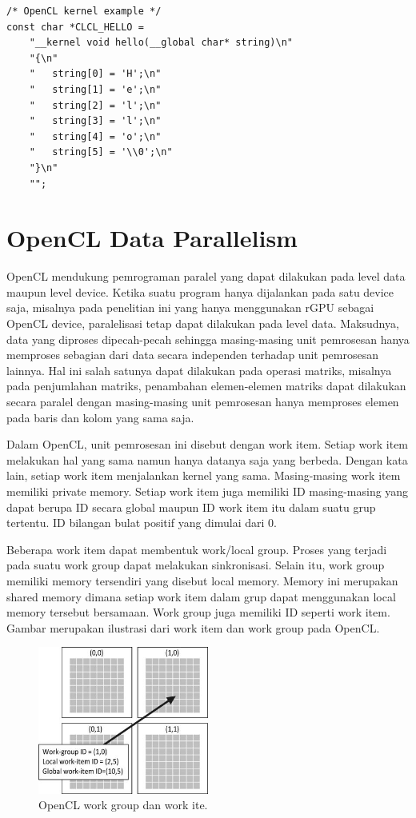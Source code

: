 \begin{lstlisting}[frame=single]
/* OpenCL kernel example */
const char *CLCL_HELLO =
    "__kernel void hello(__global char* string)\n"
    "{\n"
    "   string[0] = 'H';\n"
    "   string[1] = 'e';\n"
    "   string[2] = 'l';\n"
    "   string[3] = 'l';\n"
    "   string[4] = 'o';\n"
    "   string[5] = '\\0';\n"
    "}\n"
    "";
\end{lstlisting}

\section{OpenCL Data Parallelism}
OpenCL mendukung pemrograman paralel yang dapat dilakukan pada level data maupun level device. Ketika suatu program hanya dijalankan pada satu device saja, misalnya pada penelitian ini yang hanya menggunakan rGPU sebagai OpenCL device, paralelisasi tetap dapat dilakukan pada level data. Maksudnya, data yang diproses dipecah-pecah sehingga masing-masing unit pemrosesan hanya memproses sebagian dari data secara independen terhadap unit pemrosesan lainnya. Hal ini salah satunya dapat dilakukan pada operasi matriks, misalnya pada penjumlahan matriks, penambahan elemen-elemen matriks dapat dilakukan secara paralel dengan masing-masing unit pemrosesan hanya memproses elemen pada baris dan kolom yang sama saja.

Dalam OpenCL, unit pemrosesan ini disebut dengan work item. Setiap work item melakukan hal yang sama namun hanya datanya saja yang berbeda. Dengan kata lain, setiap work item menjalankan kernel yang sama. Masing-masing work item memiliki private memory. Setiap work item juga memiliki ID masing-masing yang dapat berupa ID secara global maupun ID work item itu dalam suatu grup tertentu. ID bilangan bulat positif yang dimulai dari 0.  

Beberapa work item dapat membentuk work/local group. Proses yang terjadi pada suatu work group dapat melakukan sinkronisasi. Selain itu, work group memiliki memory tersendiri yang disebut local memory. Memory ini merupakan shared memory dimana setiap work item dalam grup dapat menggunakan local memory tersebut bersamaan. Work group juga memiliki ID seperti work item. Gambar merupakan ilustrasi dari work item dan work group pada OpenCL.

\begin{figure}
	\centering
	\includegraphics[width=0.50\textwidth]
	{pics/opencl-work.jpg}
	\caption{OpenCL work group dan work ite.}
	\label{fig:work}
\end{figure}

